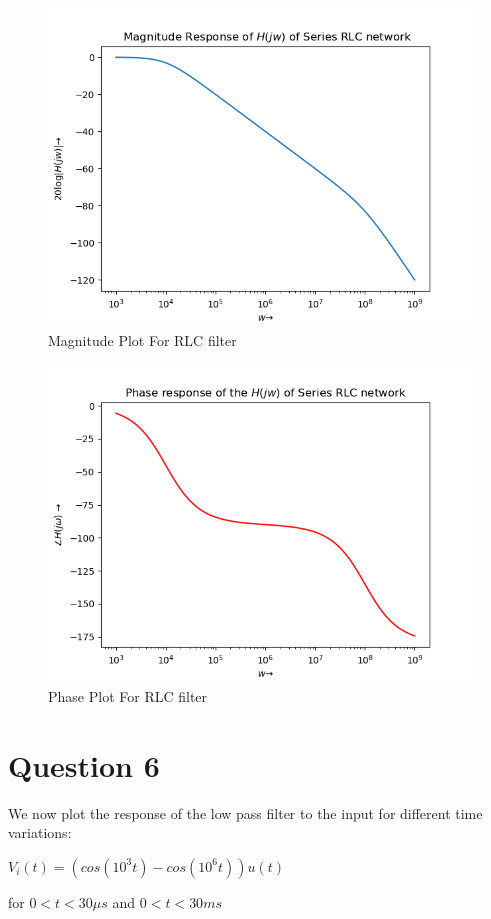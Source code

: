 \documentclass{article}
\begin{document}
\begin{figure}[h!]
\includegraphics[scale=0.5]{fig10_6.png}
\centering
\caption{Magnitude Plot For RLC filter}
\label{Magnitude Plot For RLC filter}
\end{figure}
\begin{figure}[h!]
\includegraphics[scale=0.6]{fig11_6.png}
\centering
\caption{Phase Plot For RLC filter}
\label{Phase Plot For RLC filter}
\end{figure}


\section*{Question 6}
We now plot the response of the low pass filter to the input for different time variations:\newline
\begin{center}
$V_i(t) = (cos(10^3t) - cos(10^6t))u(t)$
\end{center}\newline
for $0<t<30\mu s$ and $0<t<30ms$
\end{document}
